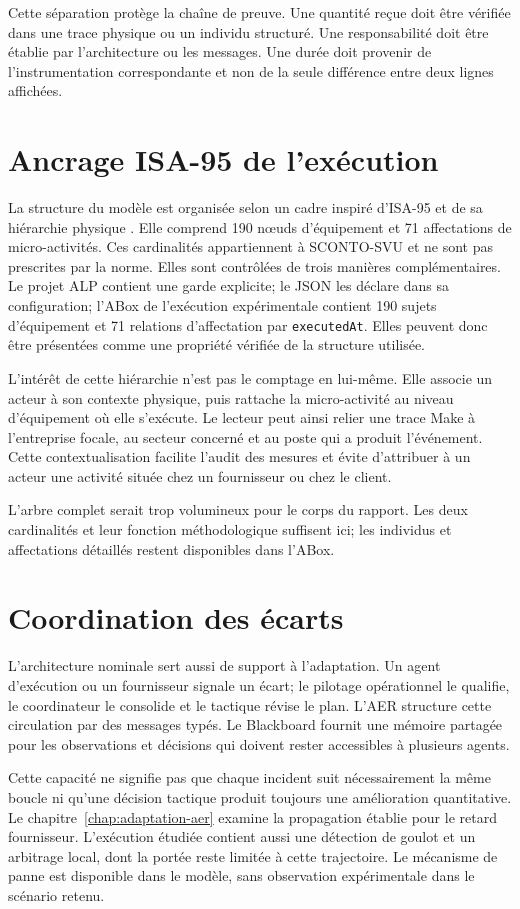 Cette séparation protège la chaîne de preuve. Une quantité reçue doit être vérifiée dans une trace physique ou un individu structuré. Une responsabilité doit être établie par l'architecture ou les messages. Une durée doit provenir de l'instrumentation correspondante et non de la seule différence entre deux lignes affichées.

\section{Ancrage ISA-95 de l'exécution}

La structure du modèle est organisée selon un cadre inspiré d'ISA-95 et de sa hiérarchie physique \cite{isa2025}. Elle comprend 190 nœuds d'équipement et 71 affectations de micro-activités. Ces cardinalités appartiennent à SCONTO-SVU et ne sont pas prescrites par la norme. Elles sont contrôlées de trois manières complémentaires. Le projet ALP contient une garde explicite; le JSON les déclare dans sa configuration; l'ABox de l'exécution expérimentale contient 190 sujets d'équipement et 71 relations d'affectation par \texttt{executedAt}. Elles peuvent donc être présentées comme une propriété vérifiée de la structure utilisée.

L'intérêt de cette hiérarchie n'est pas le comptage en lui-même. Elle associe un acteur à son contexte physique, puis rattache la micro-activité au niveau d'équipement où elle s'exécute. Le lecteur peut ainsi relier une trace Make à l'entreprise focale, au secteur concerné et au poste qui a produit l'événement. Cette contextualisation facilite l'audit des mesures et évite d'attribuer à un acteur une activité située chez un fournisseur ou chez le client.

L'arbre complet serait trop volumineux pour le corps du rapport. Les deux cardinalités et leur fonction méthodologique suffisent ici; les individus et affectations détaillés restent disponibles dans l'ABox.

\section{Coordination des écarts}

L'architecture nominale sert aussi de support à l'adaptation. Un agent d'exécution ou un fournisseur signale un écart; le pilotage opérationnel le qualifie, le coordinateur le consolide et le tactique révise le plan. L'AER structure cette circulation par des messages typés. Le Blackboard fournit une mémoire partagée pour les observations et décisions qui doivent rester accessibles à plusieurs agents.

Cette capacité ne signifie pas que chaque incident suit nécessairement la même boucle ni qu'une décision tactique produit toujours une amélioration quantitative. Le chapitre~\ref{chap:adaptation-aer} examine la propagation établie pour le retard fournisseur. L'exécution étudiée contient aussi une détection de goulot et un arbitrage local, dont la portée reste limitée à cette trajectoire. Le mécanisme de panne est disponible dans le modèle, sans observation expérimentale dans le scénario retenu.
